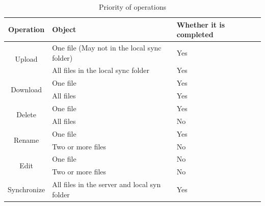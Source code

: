 \documentclass[a4paper]{article}
\begin{document}
\begin{flushleft}
\begin{table}[h]
\caption{Priority of operations}
\centering
\begin{tabular}{|c|p{8cm}|p{2cm}|}
\hline
Operation & Object & Whether it is completed \\
\hline
\multirow{2}{*}{Upload}&{One file (May not in the local sync folder)}&Yes\\
\cline{2-3}
&All files in the local sync folder&Yes\\
\cline{1-3}
\multirow{2}{*}{Download}&{One file}&Yes\\
\cline{2-3}
&All files&Yes\\
\cline{1-3}
\multirow{2}{*}{Delete}&{One file}&Yes\\
\cline{2-3}
&All files&No\\
\cline{1-3}
\multirow{2}{*}{Rename}&{One file}&Yes\\
\cline{2-3}
&Two or more files&No\\
\cline{1-3}
\multirow{2}{*}{Edit}&{One file}&No\\
\cline{2-3}
&Two or more files&No\\
\cline{1-3}
\multirow{1}{*}{Synchronize}&{All files in the server and local syn folder}&Yes\\

\bottomrule
\end{tabular}
\end{table}


\end{flushleft}
\end{document}
